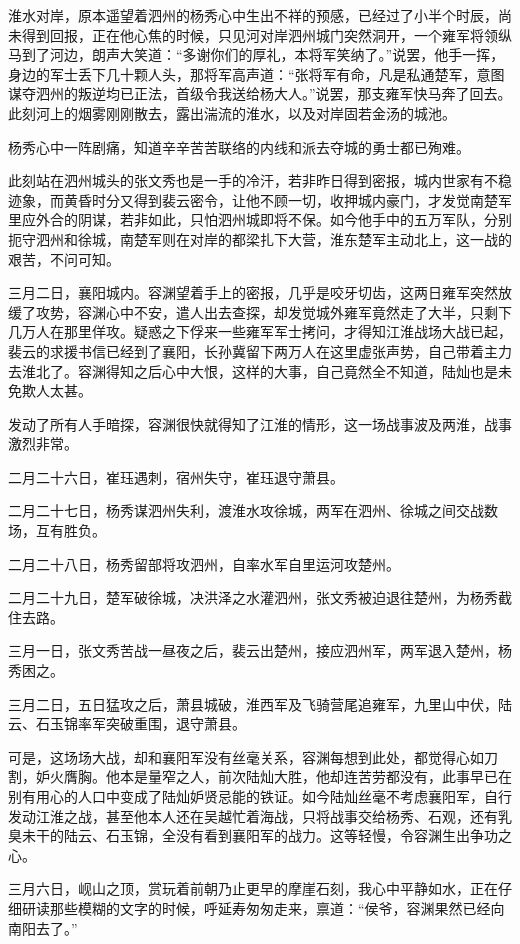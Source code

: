 淮水对岸，原本遥望着泗州的杨秀心中生出不祥的预感，已经过了小半个时辰，尚未得到回报，正在他心焦的时候，只见河对岸泗州城门突然洞开，一个雍军将领纵马到了河边，朗声大笑道：“多谢你们的厚礼，本将军笑纳了。”说罢，他手一挥，身边的军士丢下几十颗人头，那将军高声道：“张将军有命，凡是私通楚军，意图谋夺泗州的叛逆均已正法，首级令我送给杨大人。”说罢，那支雍军快马奔了回去。此刻河上的烟雾刚刚散去，露出湍流的淮水，以及对岸固若金汤的城池。

杨秀心中一阵剧痛，知道辛辛苦苦联络的内线和派去夺城的勇士都已殉难。

此刻站在泗州城头的张文秀也是一手的冷汗，若非昨日得到密报，城内世家有不稳迹象，而黄昏时分又得到裴云密令，让他不顾一切，收押城内豪门，才发觉南楚军里应外合的阴谋，若非如此，只怕泗州城即将不保。如今他手中的五万军队，分别扼守泗州和徐城，南楚军则在对岸的都梁扎下大营，淮东楚军主动北上，这一战的艰苦，不问可知。

三月二日，襄阳城内。容渊望着手上的密报，几乎是咬牙切齿，这两日雍军突然放缓了攻势，容渊心中不安，遣人出去查探，却发觉城外雍军竟然走了大半，只剩下几万人在那里佯攻。疑惑之下俘来一些雍军军士拷问，才得知江淮战场大战已起，裴云的求援书信已经到了襄阳，长孙冀留下两万人在这里虚张声势，自己带着主力去淮北了。容渊得知之后心中大恨，这样的大事，自己竟然全不知道，陆灿也是未免欺人太甚。

发动了所有人手暗探，容渊很快就得知了江淮的情形，这一场战事波及两淮，战事激烈非常。

二月二十六日，崔珏遇刺，宿州失守，崔珏退守萧县。

二月二十七日，杨秀谋泗州失利，渡淮水攻徐城，两军在泗州、徐城之间交战数场，互有胜负。

二月二十八日，杨秀留部将攻泗州，自率水军自里运河攻楚州。

二月二十九日，楚军破徐城，决洪泽之水灌泗州，张文秀被迫退往楚州，为杨秀截住去路。

三月一日，张文秀苦战一昼夜之后，裴云出楚州，接应泗州军，两军退入楚州，杨秀困之。

三月二日，五日猛攻之后，萧县城破，淮西军及飞骑营尾追雍军，九里山中伏，陆云、石玉锦率军突破重围，退守萧县。

可是，这场场大战，却和襄阳军没有丝毫关系，容渊每想到此处，都觉得心如刀割，妒火膺胸。他本是量窄之人，前次陆灿大胜，他却连苦劳都没有，此事早已在别有用心的人口中变成了陆灿妒贤忌能的铁证。如今陆灿丝毫不考虑襄阳军，自行发动江淮之战，甚至他本人还在吴越忙着海战，只将战事交给杨秀、石观，还有乳臭未干的陆云、石玉锦，全没有看到襄阳军的战力。这等轻慢，令容渊生出争功之心。

三月六日，岘山之顶，赏玩着前朝乃止更早的摩崖石刻，我心中平静如水，正在仔细研读那些模糊的文字的时候，呼延寿匆匆走来，禀道：“侯爷，容渊果然已经向南阳去了。”

